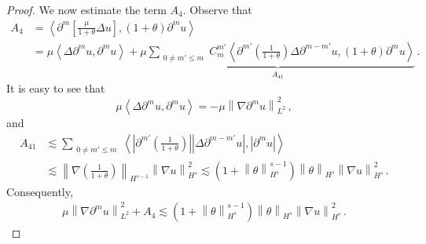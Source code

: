 \documentclass[reqno,11pt]{amsart}
\numberwithin{equation}{section}
\begin{document}
\begin{proof}
We now estimate the term $A_4$. Observe that
\begin{equation*}
\begin{aligned}
A_4&= \left\langle \partial^m \left[ \frac{\mu}{1+\theta} \Delta u \right], (1+\theta)\partial^m u \right\rangle \\
&= \mu \left\langle \Delta \partial^m u, \partial^m u \right\rangle +\underset{A_{41}}{\underbrace{  \mu \sum_{\substack{0 \neq m' \leq m}} C_m^{m'} \left\langle \partial^{m'} \left( \frac{1}{1+\theta} \right) \Delta \partial^{m - m'} u, (1+\theta)\partial^m u \right\rangle}}
 \,.
\end{aligned}
\end{equation*}
It is easy to see that
$$ \mu \left\langle \Delta \partial^m u, \partial^m u \right\rangle = -\mu \left\| \nabla \partial^m u \right\|_{L^2}^2 \,, $$
and
\begin{equation}\label{u-eq5}
\begin{aligned}
A_{41}&\lesssim\sum_{\substack{0 \neq m' \leq m}} \left\langle \left| \partial^{m'} \left( \frac{1}{1+\theta} \right) \right| \left| \Delta \partial^{m - m'} u \right|, \left| \partial^m u \right| \right\rangle \\
&\lesssim \left\| \nabla \left( \frac{1}{1+\theta} \right) \right\|_{H^{s-1}} \left\| \nabla u \right\|_{H^s}^2 \lesssim \left( 1 + \left\| \theta \right\|_{H^s}^{s-1} \right) \left\| \theta \right\|_{H^s} \left\| \nabla u \right\|_{H^s}^2 \,.
\end{aligned}
\end{equation}
Consequently,
\begin{equation}\label{u-eq6}
\begin{aligned}
 \mu \left\| \nabla \partial^m u \right\|_{L^2}^2 + A_4 \lesssim \left( 1 + \left\| \theta \right\|_{H^s}^{s-1} \right) \left\| \theta \right\|_{H^s} \left\| \nabla u \right\|_{H^s}^2 \,.
\end{aligned}
\end{equation}


\end{proof}
\end{document}
